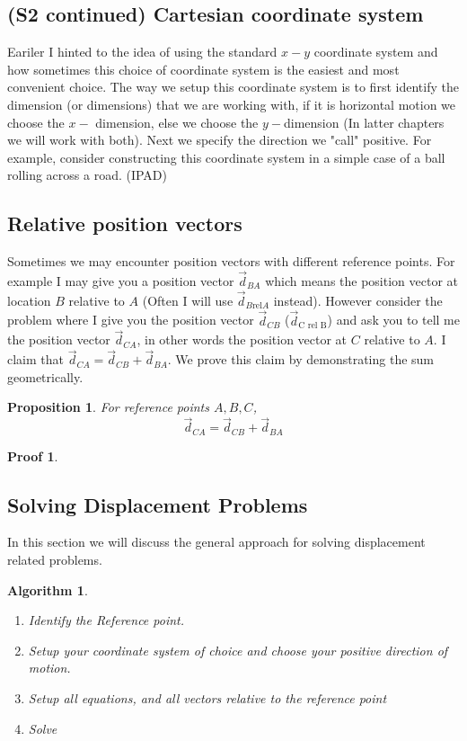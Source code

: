 \documentclass[12pt]{article}
\newcommand{\tx}[1]{\text{#1}}
\theoremstyle{break}
\newtheorem{algo}[thm]{Algorithm}
\newtheorem*{pf}{Proof}
\newtheorem{prop}[thm]{Proposition}
\begin{document}
\let\ref\Cref
\subsection{(S2 continued) Cartesian coordinate system}
Eariler I hinted to the idea of using the standard $x-y$ coordinate system and how sometimes this choice of coordinate system is the easiest and most convenient choice. The way we setup this coordinate system is to first identify the dimension (or dimensions) that we are working with, if it is horizontal motion we choose the $x-$ dimension, else we choose the $y-$dimension (In latter chapters we will work with both). Next we specify the direction we "call" positive. For example, consider constructing this coordinate system in a simple case of a ball rolling across a road. (IPAD)
\vspace*{5cm}

\subsection{Relative position vectors}
Sometimes we may encounter position vectors with different reference points. For example I may give you a position vector $\vec d_{BA}$ which means the position vector at location $B$ relative to $A$ (Often I will use $\vec d_{B \tx{rel} A}$ instead). However consider the problem where I give you the position vector $\vec d_{CB}$ ($\vec d_{\tx{C rel B}}$) and ask you to tell me the position vector $\vec d_{CA}$, in other words the position vector at $C$ relative to $A$. I claim that $\vec d_{CA} = \vec d_{CB} + \vec d_{BA}$. We prove this claim by demonstrating the sum geometrically.
\begin{prop}
   For reference points $A,B,C$, $$\vec d_{CA} = \vec d_{CB} + \vec d_{BA}$$ 
\end{prop}
\begin{pf}
    
\end{pf}

\newpage

\subsection{Solving Displacement Problems}
In this section we will discuss the general approach for solving displacement related problems.
\begin{algo}
    \begin{enumerate}
        \item Identify the Reference point.
        \item Setup your coordinate system of choice \emph{and} choose your positive direction of motion.
        \item Setup all equations, and all vectors relative to the \emph{reference point}
        \item Solve
    \end{enumerate}
\end{algo}
\end{document}
